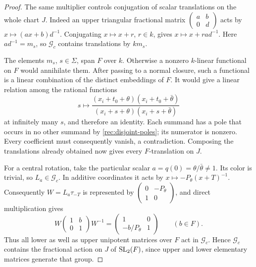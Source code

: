 \begin{proof}
The same multiplier controls conjugation of scalar translations on the
whole chart \(J\).  Indeed an upper triangular fractional matrix
\(\left(\begin{smallmatrix}a&b\\0&d\end{smallmatrix}\right)\)
acts by \(x\mapsto(ax+b)d^{-1}\).  Conjugating \(x\mapsto x+r\),
\(r\in k\), gives \(x\mapsto x+r ad^{-1}\).  Here
\(ad^{-1}=m_s\), so \(\mathcal G_c\) contains translations by
\(km_s\).

The elements \(m_s\), \(s\in\Sigma\), span \(F\) over \(k\).
Otherwise a nonzero \(k\)-linear functional on \(F\) would annihilate
them.  After passing to a normal closure, such a functional is a linear
combination of the distinct embeddings of \(F\).  It would give a
linear relation among the rational functions
\[
 s\longmapsto
 \frac{(x_i+t_0+\theta)(x_i+t_0+\bar\theta)}
      {(x_i+s+\theta)(x_i+s+\bar\theta)}
\]
at infinitely many \(s\), and therefore an identity.  Each summand
has a pole that occurs in no other summand by
\eqref{rec:disjoint-poles}; its numerator is nonzero.  Every coefficient
must consequently vanish, a contradiction.  Composing the translations
already obtained now gives every \(F\)-translation on \(J\).

For a central rotation, take the particular scalar
\(a=q(0)=\theta/\bar\theta\ne1\).  Its color is trivial, so
\(L_a\in\mathcal G_c\).  In additive coordinates it acts by
\(x\mapsto-P_\theta(x+T)^{-1}\).  Consequently
\(W=L_a\tau_{-T}\) is represented by
\(\left(\begin{smallmatrix}0&-P_\theta\\1&0\end{smallmatrix}\right)\),
and direct multiplication gives
\[
 W\begin{pmatrix}1&b\\0&1\end{pmatrix}W^{-1}
       =\begin{pmatrix}1&0\\-b/P_\theta&1\end{pmatrix}
       \qquad(b\in F).
\]
Thus all lower as well as upper unipotent matrices over \(F\) act in
\(\mathcal G_c\).  Hence \(\mathcal G_c\) contains the fractional action
on \(J\) of \(\operatorname{SL}_2(F)\), since upper and lower elementary matrices
generate that group.


\end{proof}
